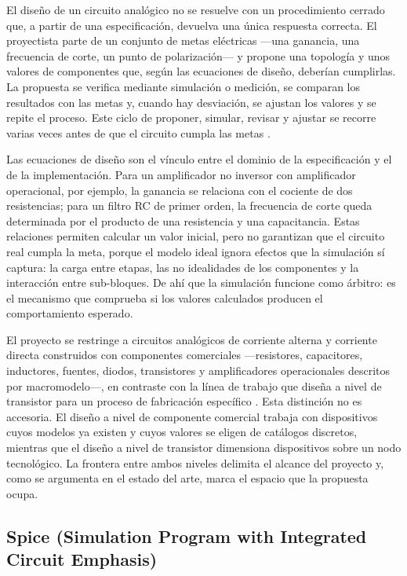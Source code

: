 El diseño de un circuito analógico no se resuelve con un procedimiento cerrado que, a partir de una especificación, devuelva una única respuesta correcta. El proyectista parte de un conjunto de metas eléctricas ---una ganancia, una frecuencia de corte, un punto de polarización--- y propone una topología y unos valores de componentes que, según las ecuaciones de diseño, deberían cumplirlas. La propuesta se verifica mediante simulación o medición, se comparan los resultados con las metas y, cuando hay desviación, se ajustan los valores y se repite el proceso. Este ciclo de proponer, simular, revisar y ajustar se recorre varias veces antes de que el circuito cumpla las metas \cite{sedra2015microelectronic}.

Las ecuaciones de diseño son el vínculo entre el dominio de la especificación y el de la implementación. Para un amplificador no inversor con amplificador operacional, por ejemplo, la ganancia se relaciona con el cociente de dos resistencias; para un filtro RC de primer orden, la frecuencia de corte queda determinada por el producto de una resistencia y una capacitancia. Estas relaciones permiten calcular un valor inicial, pero no garantizan que el circuito real cumpla la meta, porque el modelo ideal ignora efectos que la simulación sí captura: la carga entre etapas, las no idealidades de los componentes y la interacción entre sub-bloques. De ahí que la simulación funcione como árbitro: es el mecanismo que comprueba si los valores calculados producen el comportamiento esperado.

El proyecto se restringe a circuitos analógicos de corriente alterna y corriente directa construidos con componentes comerciales ---resistores, capacitores, inductores, fuentes, diodos, transistores y amplificadores operacionales descritos por macromodelo---, en contraste con la línea de trabajo que diseña a nivel de transistor para un proceso de fabricación específico \cite{skywater_pdk}. Esta distinción no es accesoria. El diseño a nivel de componente comercial trabaja con dispositivos cuyos modelos ya existen y cuyos valores se eligen de catálogos discretos, mientras que el diseño a nivel de transistor dimensiona dispositivos sobre un nodo tecnológico. La frontera entre ambos niveles delimita el alcance del proyecto y, como se argumenta en el estado del arte, marca el espacio que la propuesta ocupa.

\subsection{Spice (Simulation Program with Integrated Circuit Emphasis)}

